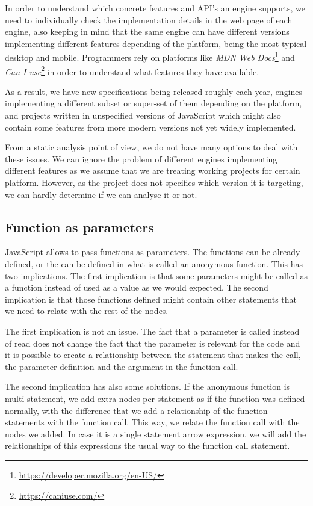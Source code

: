 \documentclass{uvamscse}
\begin{document}
In order to understand which concrete features and API's an engine supports, we need to individually check the implementation details in the web page of each engine, also keeping in mind that the same engine can have different versions implementing different features depending of the platform, being the most typical desktop and mobile. Programmers rely on platforms like \textit{MDN Web Docs}\footnote{\url{https://developer.mozilla.org/en-US/}} and \textit{Can I use}\footnote{\url{https://caniuse.com/}} in order to understand what features they have available.

As a result, we have new specifications being released roughly each year, engines implementing a different subset or super-set of them depending on the platform, and projects written in unspecified versions of JavaScript which might also contain some features from more modern versions not yet widely implemented.

From a static analysis point of view, we do not have many options to deal with these issues. We can ignore the problem of different engines implementing different features as we assume that we are treating working projects for certain platform. However, as the project does not specifies which version it is targeting, we can hardly determine if we can analyse it or not.

\subsection{Function as parameters}
JavaScript allows to pass functions as parameters. The functions can be already defined, or the can be defined in what is called an anonymous function. This has two implications. The first implication is that some parameters might be called as a function instead of used as a value as we would expected. The second implication is that those functions defined might contain other statements that we need to relate with the rest of the nodes.

The first implication is not an issue. The fact that a parameter is called instead of read does not change the fact that the parameter is relevant for the code and it is possible to create a relationship between the statement that makes the call, the parameter definition and the argument in the function call.

The second implication has also some solutions. If the anonymous function is multi-statement, we add extra nodes per statement as if the function was defined normally, with the difference that we add a relationship of the function statements with the function call. This way, we relate the function call with the nodes we added. In case it is a single statement arrow expression, we will add the relationships of this expressions the usual way to the function call statement.
\end{document}
